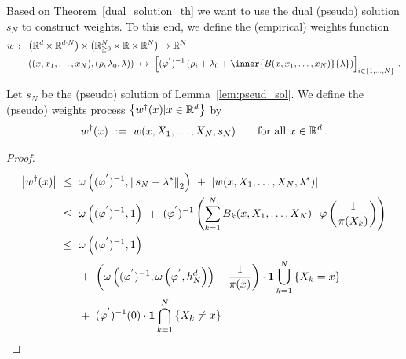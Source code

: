 Based on Theorem~\ref{dual_solution_th}
we want to use the dual (pseudo) solution $s_N$ to construct weights.
To this end, we define the (empirical) weights function
\begin{align*}
 w\ \colon\
 &
 \left( 
  \R^d\times \R^{d\cdot N}
 \right)
  \times
  \left( 
\R^N_{\ge 0}\times \R\times \R^N
  \right)
  \to
  \R^N
  \\
 &
  \left( 
  (x,x_1,\ldots,x_N),(\rho,\lambda_0,\lambda)
  \right)
  \ 
  \mapsto
  \ 
  \left[ 
  (\varphi^{'})^{-1}
  \left( 
    \rho_i
    +
    \lambda_0
    +
    \inner
    {B(x,x_1,\ldots,x_N)}
    {\lambda}
  \right)
\right]_{i\in \left\{ 1,\ldots,N \right\}}
\,.
\end{align*}
\begin{definition}
  Let $s_N$ be the (pseudo) solution of Lemma~\ref{lem:pseud_sol}.
  We define the (pseudo) weights process 
  $\left\{ w^\dagger(x) | x\in\mathbb{R}^d\right\}$
  by
  \begin{align*}
    w^\dagger(x) 
    \ 
    :=
    \ 
    w(x,X_1,\ldots,X_N,s_N)
    \qquad
    \text{for all}\ 
    x\in\R^d
    \,.
  \end{align*}
\end{definition}
\begin{proof}
  \begin{align*}
    \left| w^\dagger(x) \right|
    &
    \ 
    \le
    \ 
    \omega
    \left( 
      (
      \varphi^{'}
      )^{-1},
      \norm{s_N-\lambda^*}_2
    \right)
    \ 
    +
    \ 
    \left| 
    w(x,X_1,\ldots,X_N,\lambda^*)
    \right|
    \\
    &
    \ 
    \le
    \ 
    \omega
    \left( 
      (
      \varphi^{'}
      )^{-1}
      ,
      1
    \right)
    \ 
    +
    \ 
      (
      \varphi^{'}
      )^{-1}
      \left( 
        \sum_{k=1}^{N}
        B_k(x,X_1,\ldots,X_N)
        \cdot
            \varphi
            \left(
              \frac
              {1}
              {\pi(X_k)}
            \right)
      \right)
      \\
    &
    \ 
      \le
    \ 
    \omega
    \left( 
      (
      \varphi^{'}
      )^{-1}
      ,
      1
    \right)
    \\
    &
    \qquad 
    +
    \ 
    \left( 
 \omega
    \left( 
      (
      \varphi^{'}
      )^{-1}
      ,
      \omega
      \left( 
      \varphi^{'}
      ,
      h_N^d
      \right)
    \right)
    +
              \frac
              {1}
              {\pi(x)}
    \right)
    \cdot
    \mathbf{1}\bigcup_{k=1}^N\left\{ X_k=x\right\}
    \\
    &\qquad
    +
    \ 
      (
      \varphi^{'}
      )^{-1}
      (0)
      \cdot
    \mathbf{1}\bigcap_{k=1}^N\left\{ X_k\neq x\right\}
     \end{align*}
\end{proof}
